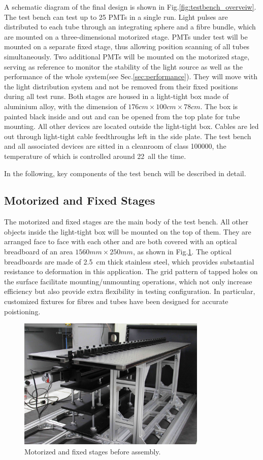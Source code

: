 \documentclass[5p, times]{elsarticle}
\begin{document}
A schematic diagram of the final design is shown in Fig.\ref{fig:testbench_overveiw}.
The test bench can test up to 25 PMTs in a single run.
Light pulses are distributed to each tube through an integrating sphere and a fibre bundle, which are mounted on a three-dimensional motorized stage.
PMTs under test will be mounted on a separate fixed stage, thus allowing position scanning of all tubes simultaneously.
Two additional PMTs will be mounted on the motorized stage, serving as reference to monitor the stability of the light source as well as the performance of the whole system(see Sec.\ref{sec:performance}).
They will move with the light distribution system and not be removed from their fixed positions during all test runs. 
Both stages are housed in a light-tight box made of aluminium alloy, with the dimension of $176cm\times100cm\times78cm$.
The box is painted black inside and out and can be opened from the top plate for tube mounting.
All other devices are located outside the light-tight box.
Cables are led out through light-tight cable feedthroughs left in the side plate.
The test bench and all associated devices are sitted in a cleanroom of class 100000, the temperature of which is controlled around 22\textcelsius~all the time.

In the following, key components of the test bench will be described in detail.
\subsection{Motorized and Fixed Stages}
\label{sec:stages}

The motorized and fixed stages are the main body of the test bench.
All other objects inside the light-tight box will be mounted on the top of them.
They are arranged face to face with each other and are both covered with an optical breadboard of an area $1560mm\times250mm$, as shown in Fig.\ref{fig:stages}.
The optical breadboards are made of \SI{2.5}{cm} thick stainless steel, which provides substantial resistance to deformation in this application.
The grid pattern of tapped holes on the surface facilitate mounting/unmounting operations, which not only increase efficiency but also provide extra flexibility in testing configuration.
In particular, customized fixtures for fibres and tubes have been designed for accurate poistioning.

\begin{figure}[h!]
 \centering
 \includegraphics[width=90mm]{stage1_crop}
\caption{Motorized and fixed stages before assembly.}
\label{fig:stages}
\end{figure} 
\end{document}
